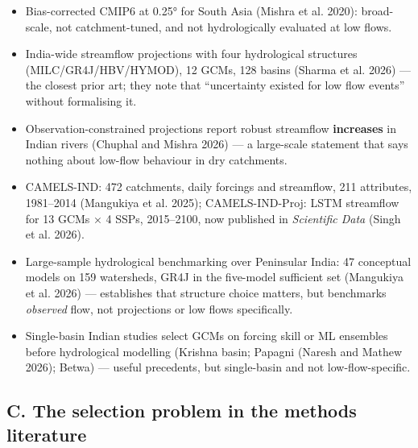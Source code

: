 \documentclass[
  11pt,
]{article}
\providecommand{\tightlist}{%
  \setlength{\itemsep}{0pt}\setlength{\parskip}{0pt}}
\begin{document}
\begin{itemize}
\tightlist
\item
  Bias-corrected CMIP6 at 0.25° for South Asia (Mishra et al. 2020):
  broad-scale, not catchment-tuned, and not hydrologically evaluated at
  low flows.
\item
  India-wide streamflow projections with four hydrological structures
  (MILC/GR4J/HBV/HYMOD), 12 GCMs, 128 basins (Sharma et al. 2026) ---
  the closest prior art; they note that ``uncertainty existed for low
  flow events'' without formalising it.
\item
  Observation-constrained projections report robust streamflow
  \textbf{increases} in Indian rivers (Chuphal and Mishra 2026) --- a
  large-scale statement that says nothing about low-flow behaviour in
  dry catchments.
\item
  CAMELS-IND: 472 catchments, daily forcings and streamflow, 211
  attributes, 1981--2014 ({Mangukiya et al.} 2025); CAMELS-IND-Proj:
  LSTM streamflow for 13 GCMs × 4 SSPs, 2015--2100, now published in
  \emph{Scientific Data} ({Singh et al.} 2026).
\item
  Large-sample hydrological benchmarking over Peninsular India: 47
  conceptual models on 159 watersheds, GR4J in the five-model sufficient
  set ({Mangukiya et al.} 2026) --- establishes that structure choice
  matters, but benchmarks \emph{observed} flow, not projections or low
  flows specifically.
\item
  Single-basin Indian studies select GCMs on forcing skill or ML
  ensembles before hydrological modelling (Krishna basin; Papagni
  (Naresh and Mathew 2026); Betwa) --- useful precedents, but
  single-basin and not low-flow-specific.
\end{itemize}

\subsection{C. The selection problem in the methods
literature}\label{c.-the-selection-problem-in-the-methods-literature}
\end{document}
